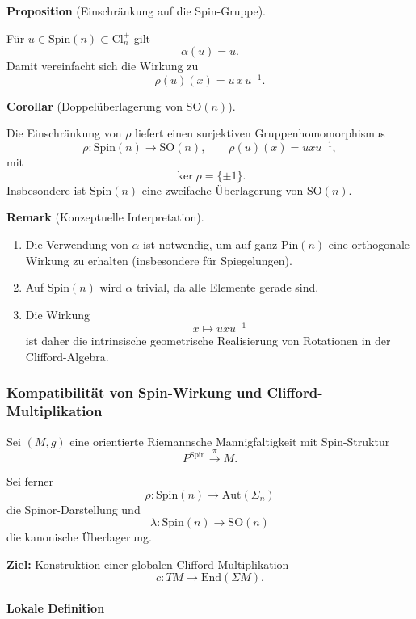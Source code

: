 \documentclass[10pt, letterpaper]{article}
\newcommand{\Aut}{\mathrm{Aut}}
\newcommand{\End}{\mathrm{End}}
\newcommand{\Cl}{\mathrm{Cl}}
\newcommand{\SO}{\mathrm{SO}}
\newcommand{\Spin}{\mathrm{Spin}}
\newcommand{\Pin}{\mathrm{Pin}}
\newcommand{\CustomHeading}[3]{%
  \par\medskip\noindent%
  \textbf{#1 #2} \textnormal{(#3)}.\enskip%
}
\newenvironment{PROP}[2]{\CustomHeading{Proposition}{#1}{#2}}{}
\newenvironment{KORO}[2]{\CustomHeading{Corollar}{#1}{#2}}{}
\newenvironment{REM}[2]{\CustomHeading{Remark}{#1}{#2}}{}
\begin{document}
\begin{PROP}{}{Einschränkung auf die Spin-Gruppe}
Für $u\in \Spin(n)\subset \Cl_n^+$ gilt
\[
\alpha(u)=u.
\]
Damit vereinfacht sich die Wirkung zu
\[
\rho(u)(x)=u\,x\,u^{-1}.
\]
\end{PROP}

\begin{KORO}{}{Doppelüberlagerung von $\SO(n)$}
Die Einschränkung von $\rho$ liefert einen surjektiven Gruppenhomomorphismus
\[
\rho:\Spin(n)\to \SO(n),
\qquad
\rho(u)(x)=u x u^{-1},
\]
mit
\[
\ker\rho=\{\pm 1\}.
\]
Insbesondere ist $\Spin(n)$ eine zweifache Überlagerung von $\SO(n)$.
\end{KORO}

\begin{REM}{}{Konzeptuelle Interpretation}
\begin{enumerate}
\item Die Verwendung von $\alpha$ ist notwendig, um auf ganz $\Pin(n)$ eine orthogonale Wirkung zu erhalten (insbesondere für Spiegelungen).
\item Auf $\Spin(n)$ wird $\alpha$ trivial, da alle Elemente gerade sind.
\item Die Wirkung
\[
x \mapsto u x u^{-1}
\]
ist daher die intrinsische geometrische Realisierung von Rotationen in der Clifford-Algebra.
\end{enumerate}
\end{REM}



\pagebreak

\subsubsection{Kompatibilität von Spin-Wirkung und Clifford-Multiplikation}

Sei $(M,g)$ eine orientierte Riemannsche Mannigfaltigkeit mit Spin-Struktur
\[
P^{\Spin}\xrightarrow{\;\pi\;} M.
\]

Sei ferner
\[
\rho:\Spin(n)\to \Aut(\Sigma_n)
\]
die Spinor-Darstellung und
\[
\lambda:\Spin(n)\to \SO(n)
\]
die kanonische Überlagerung.

\medskip

\textbf{Ziel:} Konstruktion einer globalen Clifford-Multiplikation
\[
c:TM\longrightarrow \End(\Sigma M).
\]

\paragraph{Lokale Definition}
\end{document}
